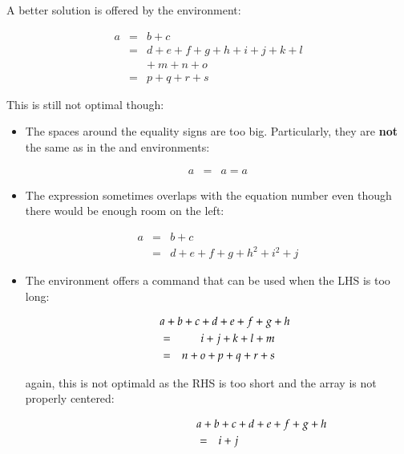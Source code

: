 A better solution is offered by the  environment:
\begin{example}
\begin{eqnarray}
  a & = & b + c \\
  & = & d + e + f + g + h + i 
  + j + k + l \nonumber \\
  && +\: m + n + o \\
  & = & p + q + r + s
\end{eqnarray}
\end{example}

This is still not optimal though:
\begin{itemize}
\item The spaces around the equality signs are too big.
  Particularly, they are \textbf{not} the same as in the
   and  environments:
\begin{example}
\begin{eqnarray}
  a & = & a = a
\end{eqnarray}
\end{example}

\item The expression sometimes overlaps with the equation number even
  though there would be enough room on the left:
\begin{example}
\begin{eqnarray}
  a & = & b + c 
  \\
  & = & d + e + f + g + h^2 
  + i^2 + j 
  \label{eq:faultyeqnarray}
\end{eqnarray}
\end{example}

\item The environment offers a command  that can
  be used when the LHS is too long:
\begin{example}
\begin{eqnarray}
  \lefteqn{a + b + c + d 
    + e + f + g + h}\nonumber\\
  & = & i + j + k + l + m 
  \\
  & = & n + o + p + q + r + s
\end{eqnarray}
\end{example}
again, this is not optimald as the RHS is too short and the array is
not properly centered:
\begin{example}
\begin{eqnarray}
  \lefteqn{a + b + c + d 
    + e + f + g + h} 
  \nonumber \\
  & = & i + j 
\end{eqnarray}
\end{example}
\end{itemize}

